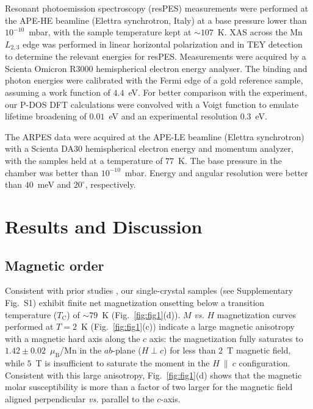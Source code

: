 \documentclass[preprint,amsmath,amssymb,aps,nofootinbib,superscriptaddress]{revtex4-2}
\begin{document}
Resonant photoemission spectroscopy (resPES) measurements were performed at the APE-HE beamline (Elettra synchrotron, Italy) at a base pressure lower than $10^{-10}$~mbar, with the sample temperature kept at $\sim107$~K. XAS across the Mn $L_{2,3}$ edge was performed in linear horizontal polarization and in TEY detection to determine the relevant energies for resPES. Measurements were acquired by a Scienta Omicron R3000 hemispherical electron energy analyser. The binding and photon energies were calibrated with the Fermi edge of a gold reference sample, assuming a work function of $4.4$~eV. For better comparison with the experiment, our P-DOS DFT calculations were convolved with a Voigt function to emulate lifetime broadening of $0.01$~eV and an experimental resolution $0.3$~eV.

The ARPES data were acquired at the APE-LE beamline (Elettra synchrotron) with a Scienta DA30 hemispherical electron energy and momentum analyzer, with the samples held at a temperature of $77$~K. The base pressure in the chamber was better than $10^{-10}$~mbar. Energy and angular resolution were better than $40$~meV and $20^\circ$, respectively. 

\section{Results and Discussion}
\subsection{Magnetic order}
Consistent with prior studies \cite{PRB2017May,PRB2018Liu,APL2020Martinez}, our single-crystal samples (see Supplementary Fig.~S1) exhibit finite net magnetization onsetting below a transition temperature ($T_\mathrm{C}$) of $\sim79$~K (Fig.~\ref{fig:fig1}(d)). $M$ {\it vs.} $H$ magnetization curves performed at $T=2$~K (Fig.~\ref{fig:fig1}(c)) indicate a large magnetic anisotropy with a magnetic hard axis along the $c$ axis: the magnetization fully saturates to $1.42\pm0.02$~$\mu_\mathrm{B}$/Mn in the $ab$-plane ($H\perp{}c$) for less than $2$~T magnetic field, while $5$~T is insufficient to saturate the moment in the $H~\parallel~c$ configuration. Consistent with this large anisotropy, Fig.~\ref{fig:fig1}(d) shows that the magnetic molar susceptibility is more than a factor of two larger for the magnetic field aligned perpendicular {\it vs.} parallel to the $c$-axis. 
\end{document}
